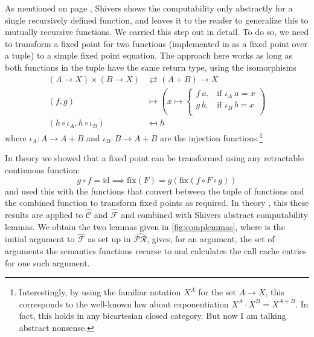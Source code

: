 \documentclass[a4paper,parskip=half,BCOR=8mm,DIV=calc,12pt]{scrbook}
\newcommand{\aC}{\widehat{\mathcal C}}
\newcommand{\aF}{\widehat{\mathcal F}}
\newcommand{\aPR}{\widehat{\mathcal {PR}}}
\newcommand{\id}{\text{id}}
\newcommand{\fix}{\text{fix}}
\begin{document}
As mentioned on page \pageref{shiverscomputabilty}, Shivers shows the computability only abstractly for a single recursively defined function, and leaves it to the reader to generalize this to mutually recursive functions. We carried this step out in detail. To do so, we need to transform a fixed point for two functions (implemented in  as a fixed point over a tuple) to a simple fixed point equation. The approach here works as long as both functions in the tuple have the same return type, using the isomorphisms
\begin{align*}
(A \to X) \times (B \to X) &\rightleftarrows  (A + B) \to X \\
(f,g) &\mapsto \left(x\mapsto
\begin{cases}
f\ a,&\text{if } \iota_A\ a = x \\
g\ b,&\text{if } \iota_B\ b = x \\
\end{cases} \right) \\
(h \circ  \iota_A, h \circ \iota_B) &\mapsfrom h
\end{align*}
where $\iota_A \colon A \to A + B$ and $\iota_B \colon B \to A + B$ are the injection functions.\footnote{Interestingly, by using the familiar notation $X^A$ for the set $A\to X$, this corresponds to the well-known law about exponentiation $X^A\cdot X^B = X^{A+B}$. In fact, this holds in any bicartesian closed category. But now I am talking abstract nonsense.}

In theory  we showed that a fixed point can be transformed using any retractable continuous function:
\[
g \circ f = \id \implies \fix(F) = g(\fix(f \circ F \circ g))
\]
and used this with the functions that convert between the tuple of functions and the combined function to transform fixed points as required. In theory , this these results are applied to $\aC$ and $\aF$ and combined with Shivers abstract computability lemmas. We obtain the two lemmas given in \vref{fig:complemmas}, where  is the initial argument to $\aF$ as set up in $\aPR$,  gives, for an argument, the set of arguments the semantics functions recurse to and  calculates the call cache entries for one such argument.
\end{document}
